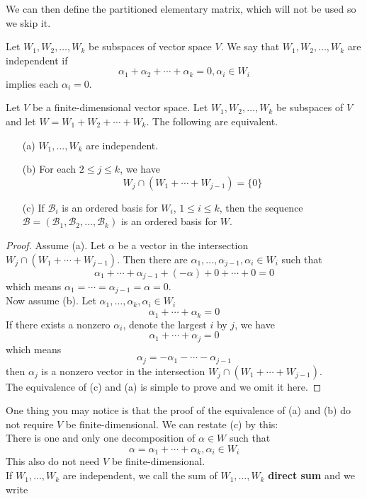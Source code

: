 \documentclass{article}
\begin{document}
We can then define the partitioned elementary matrix, which will not be used so we skip it.
\begin{dde}
	Let $W_1,W_2,\dots,W_k$ be subspaces of vector space $V$. We say that $W_1,W_2,\dots,W_k$ are independent if
	\[\alpha_1+\alpha_2+\cdots+\alpha_k=0,\alpha_i\in W_i\]
	implies each $\alpha_i=0$.
\end{dde}
\begin{thm}
	Let $V$ be a finite-dimensional vector space. Let $W_1,W_2,\dots,W_k$ be subspaces of $V$ and let $W=W_1+W_2+\cdots+W_k$. The following are equivalent.
	\begin{enumerate}
		\item [(a)]$W_1,\dots,W_k$ are independent.
		\item [(b)]For each $2\le j\le k$, we have
		\[W_j\cap(W_1+\cdots+W_{j-1})=\{0\}\]
		\item [(c)]If $\mathcal{B}_i$ is an ordered basis for $W_i$, $1\le i\le k$, then the sequence $\mathcal{B}=(\mathcal{B}_1,\mathcal{B}_2,\dots,\mathcal{B}_k)$ is an ordered basis for $W$.
	\end{enumerate}
\end{thm}
\begin{proof}
	Assume (a). Let $\alpha$ be a vector in the intersection $W_j\cap(W_1+\cdots+W_{j-1})$. Then there are $\alpha_1,\dots,\alpha_{j-1},\alpha_i\in W_i$ such that
	\[\alpha_1+\cdots+\alpha_{j-1}+(-\alpha)+0+\cdots+0=0\]
	which means $\alpha_1=\cdots=\alpha_{j-1}=\alpha=0$.\\
	Now assume (b). Let $\alpha_1,\dots,\alpha_k,\alpha_i\in W_i$
	\[\alpha_1+\cdots+\alpha_k=0\]
	If there exists a nonzero $\alpha_i$, denote the largest $i$ by $j$, we have
	\[\alpha_1+\cdots+\alpha_j=0\]
	which means
	\[\alpha_j=-\alpha_1-\cdots-\alpha_{j-1}\]
	then $\alpha_j$ is a nonzero vector in the intersection $W_j\cap(W_1+\cdots+W_{j-1})$.\\
	The equivalence of (c) and (a) is simple to prove and we omit it here.
\end{proof}
One thing you may notice is that the proof of the equivalence of (a) and (b) do not require $V$ be finite-dimensional. We can restate (c) by this:\\
\indent There is one and only one decomposition of $\alpha\in W$ such that
\[\alpha=\alpha_1+\cdots+\alpha_k,\alpha_i\in W_i\]
This also do not need $V$ be finite-dimensional.\\ 
\indent If $W_1,\dots,W_k$ are independent, we call the sum of $W_1,\dots,W_k$ \textbf{direct sum} and we write
\end{document}
